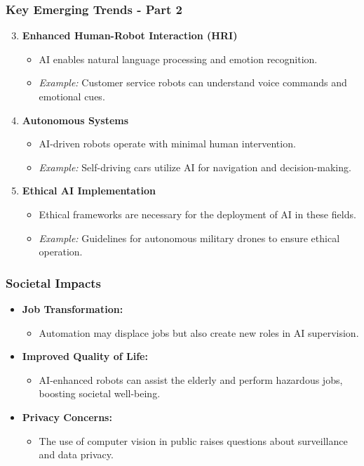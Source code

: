 \documentclass[aspectratio=169]{beamer}
\begin{document}
\begin{frame}[fragile]
    \frametitle{Key Emerging Trends - Part 2}
    \begin{enumerate}
        \setcounter{enumi}{2}
        \item \textbf{Enhanced Human-Robot Interaction (HRI)}
        \begin{itemize}
            \item AI enables natural language processing and emotion recognition.
            \item \textit{Example:} Customer service robots can understand voice commands and emotional cues.
        \end{itemize}

        \item \textbf{Autonomous Systems}
        \begin{itemize}
            \item AI-driven robots operate with minimal human intervention.
            \item \textit{Example:} Self-driving cars utilize AI for navigation and decision-making.
        \end{itemize}

        \item \textbf{Ethical AI Implementation}
        \begin{itemize}
            \item Ethical frameworks are necessary for the deployment of AI in these fields.
            \item \textit{Example:} Guidelines for autonomous military drones to ensure ethical operation.
        \end{itemize}
    \end{enumerate}
\end{frame}

\begin{frame}[fragile]
    \frametitle{Societal Impacts}
    \begin{itemize}
        \item \textbf{Job Transformation:} 
        \begin{itemize}
            \item Automation may displace jobs but also create new roles in AI supervision.
        \end{itemize}
        
        \item \textbf{Improved Quality of Life:} 
        \begin{itemize}
            \item AI-enhanced robots can assist the elderly and perform hazardous jobs, boosting societal well-being.
        \end{itemize}
        
        \item \textbf{Privacy Concerns:} 
        \begin{itemize}
            \item The use of computer vision in public raises questions about surveillance and data privacy.
        \end{itemize}
    \end{itemize}
\end{frame}
\end{document}
